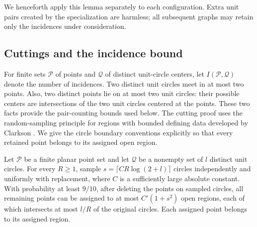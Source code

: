 We henceforth apply this lemma separately to each configuration. Extra
unit pairs created by the specialization are harmless; all subsequent
graphs may retain only the incidences under consideration.

\subsection{Cuttings and the incidence bound}

For finite sets \(\mathcal P\) of points and \(\mathcal Q\) of distinct
unit-circle centers, let \(I(\mathcal P,\mathcal Q)\) denote the number
of incidences. Two distinct unit circles meet in at most two points.
Also, two distinct points lie on at most two unit circles: their possible
centers are intersections of the two unit circles centered at the points.
These two facts provide the pair-counting bounds used below.
The cutting proof uses the random-sampling principle for regions with
bounded defining data developed by Clarkson \cite[Section~4]{Clarkson1987}.
We give the circle boundary conventions explicitly so that every retained
point belongs to its assigned open region.

\begin{lemma}\label{inc:cutting}
Let \(\mathcal P\) be a finite planar point set and let \(\mathcal Q\)
be a nonempty set of \(l\) distinct unit circles. For every \(R\ge1\),
sample
\(s=\lceil C R\log(2+l)\rceil\) circles independently and uniformly
with replacement, where \(C\) is a sufficiently large absolute constant.
With probability at least \(9/10\), after deleting the points on sampled
circles, all remaining points can be assigned to at most \(C'(1+s^2)\)
open regions, each of which intersects at most \(l/R\) of the original
circles. Each assigned point belongs to its assigned region.
\end{lemma}

